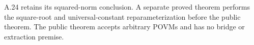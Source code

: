 
A.24 retains its squared-norm conclusion. A separate proved theorem performs
the square-root and universal-constant reparameterization before the public
theorem. The public theorem accepts arbitrary POVMs and has no bridge or
extraction premise.


